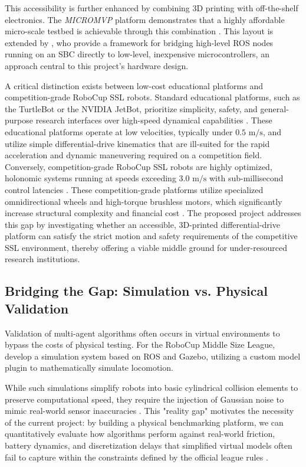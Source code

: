 \documentclass[a4paper,twoside,12pt]{report}
\begin{document}
This accessibility is further enhanced by combining 3D printing with off-the-shelf electronics. The \textit{MICROMVP} platform demonstrates that a highly affordable micro-scale testbed is achievable through this combination \citep{yu2017portable}. This layout is extended by \citet{joseph2018robot}, who provide a framework for bridging high-level ROS nodes running on an SBC directly to low-level, inexpensive microcontrollers, an approach central to this project’s hardware design.

A critical distinction exists between low-cost educational platforms and competition-grade RoboCup SSL robots. Standard educational platforms, such as the TurtleBot or the NVIDIA JetBot, prioritize simplicity, safety, and general-purpose research interfaces over high-speed dynamical capabilities \citep{joseph2018robot}. These educational platforms operate at low velocities, typically under $0.5\text{ m/s}$, and utilize simple differential-drive kinematics that are ill-suited for the rapid acceleration and dynamic maneuvering required on a competition field. Conversely, competition-grade RoboCup SSL robots are highly optimized, holonomic systems running at speeds exceeding $3.0\text{ m/s}$ with sub-millisecond control latencies \citep{liang2025first}. These competition-grade platforms utilize specialized omnidirectional wheels and high-torque brushless motors, which significantly increase structural complexity and financial cost \citep{ateam2023tdp}. The proposed project addresses this gap by investigating whether an accessible, 3D-printed differential-drive platform can satisfy the strict motion and safety requirements of the competitive SSL environment, thereby offering a viable middle ground for under-resourced research institutions.

\subsection{Bridging the Gap: Simulation vs. Physical Validation}
Validation of multi-agent algorithms often occurs in virtual environments to bypass the costs of physical testing. For the RoboCup Middle Size League, \citet{yao2015simulation} develop a simulation system based on ROS and Gazebo, utilizing a custom model plugin to mathematically simulate locomotion.

While such simulations simplify robots into basic cylindrical collision elements to preserve computational speed, they require the injection of Gaussian noise to mimic real-world sensor inaccuracies \citep{yao2015simulation}. This "reality gap" motivates the necessity of the current project: by building a physical benchmarking platform, we can quantitatively evaluate how algorithms perform against real-world friction, battery dynamics, and discretization delays that simplified virtual models often fail to capture within the constraints defined by the official league rules \citep{ssl_rules_2026}.
\end{document}
